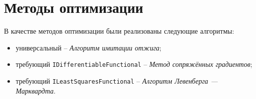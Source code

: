 \section{Методы оптимизации}

В качестве методов оптимизации были реализованы следующие алгоритмы:

\begin{itemize}
	\item универсальный -- \textsl{Алгоритм имитации отжига};
	\item требующий \texttt{IDifferentiableFunctional} -- \textsl{Метод сопряжённых градиентов};
	\item требующий \texttt{ILeastSquaresFunctional} -- \textsl{Алгоритм Левенберга — Марквардта}.
\end{itemize}
